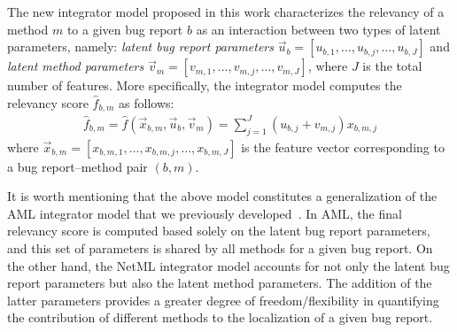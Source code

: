The new integrator model proposed in this work characterizes the relevancy of a method $m$ to a given bug report $b$ as an interaction between two types of latent parameters, namely: \emph{latent bug report parameters} $\vec{u}_b = [u_{b,1}, \ldots, u_{b,j}, \ldots, u_{b,J}]$ and \emph{latent method parameters} $\vec{v}_m = [v_{m,1}, \ldots, v_{m,j}, \ldots, v_{m,J}]$, where $J$ is the total number of features. More specifically, the integrator model computes the relevancy score $\hat{f}_{b,m}$ as follows: 
\begin{align}
\label{eq:aml_plus}
\hat{f}_{b,m} = \hat{f}(\vec{x}_{b,m}, \vec{u}_b, \vec{v}_m) = \sum_{j = 1}^{J} (u_{b,j} + v_{m,j}) x_{b,m,j}
\end{align}
where $\vec{x}_{b,m} = [x_{b,m,1}, \ldots, x_{b,m,j}, \ldots, x_{b,m,J}]$ is the feature vector corresponding to a bug report--method pair $(b, m)$.

It is worth mentioning that the above model constitutes a generalization of the AML integrator model that we previously developed~\cite{Le:2015:IRS:2786805.2786880}. In AML, the final relevancy score is computed based solely on the latent bug report parameters, and this set of parameters is shared by all methods for a given bug report. On the other hand, the NetML integrator model accounts for not only the latent bug report parameters but also the latent method parameters. The addition of the latter parameters provides a greater degree of freedom/flexibility in quantifying the contribution of different methods to the localization of a given bug report.

